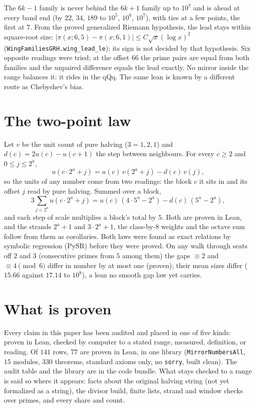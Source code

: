 \documentclass[11pt]{article}
\begin{document}
The $6k-1$ family is never behind the $6k+1$ family up to $10^7$ and is ahead at every band end (by $22$, $34$, $189$ to $10^5$, $10^6$, $10^7$), with ties at a few points, the first at $7$. From the proved generalized Riemann hypothesis, the lead stays within square-root size: $|\pi(x;6,5) - \pi(x;6,1)| \le C\sqrt{x}(\log x)^2$ (\texttt{WingFamiliesGRH.wing\_lead\_le}); its sign is not decided by that hypothesis. Six opposite readings were tried; at the offset $66$ the prime pairs are equal from both families and the unpaired difference equals the lead exactly. No mirror inside the range balances it: it rides in the qQq. The same lean is known by a different route as Chebyshev's bias.

\section{The two-point law}
Let $v$ be the unit count of pure halving ($3 = 1,2,1$) and $d(c) = 2u(c) - u(c+1)$ the step between neighbours. For every $c\ge2$ and $0\le j\le 2^a$,
\[ u(c\cdot2^a + j) = u(c)\,v(2^a+j) - d(c)\,v(j), \]
so the units of any number come from two readings: the block $c$ it sits in and its offset $j$ read by pure halving. Summed over a block,
\[ 3\sum_{j<2^a} u(c\cdot2^a+j) = u(c)\,(4\cdot5^a - 2^a) - d(c)\,(5^a-2^a), \]
and each step of scale multiplies a block's total by $5$. Both are proven in Lean, and the strands $2^a+1$ and $3\cdot2^a+1$, the class-by-$8$ weights and the octave sum follow from them as corollaries. Both laws were found as exact relations by symbolic regression (PySR) before they were proved. On any walk through seats off $2$ and $3$ (consecutive primes from $5$ among them) the gaps $\equiv 2$ and $\equiv 4 \pmod 6$ differ in number by at most one (proven); their mean sizes differ ($15.66$ against $17.14$ to $10^8$), a lean no smooth gap law yet carries.

\section{What is proven}
Every claim in this paper has been audited and placed in one of five kinds: proven in Lean, checked by computer to a stated range, measured, definition, or reading. Of $141$ rows, $77$ are proven in Lean, in one library (\texttt{MirrorNumbersAll}, $15$ modules, $330$ theorems, standard axioms only, no \texttt{sorry}, built clean). The audit table and the library are in the code bundle. What stays checked to a range is said so where it appears: facts about the original halving string (not yet formalized as a string), the divisor build, finite lists, strand and window checks over primes, and every share and count.
\end{document}
